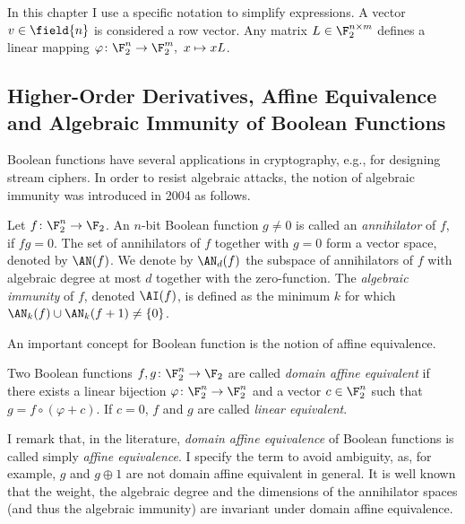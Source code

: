 
In this chapter I use a specific notation to simplify expressions. A vector $v \in \field{n}$ is considered a row vector. Any matrix $L \in \F_2^{n\times m}$ defines a linear mapping $\varphi \colon \F_2^n \rightarrow \F_2^m, \ x \mapsto xL$.

\subsection{Higher-Order Derivatives, Affine Equivalence and Algebraic Immunity of Boolean Functions}

Boolean functions have several applications in cryptography, e.g., for designing stream ciphers. In order to resist algebraic attacks, the notion of algebraic immunity was introduced in 2004 as follows.

\begin{definition}
Let $f\colon \F_2^n \rightarrow \F_2$. An $n$-bit Boolean function $g \neq 0$ is called an \emph{annihilator} of $f$, if $f g = 0$. The set of annihilators of $f$ together with $g=0$ form a vector space, denoted by $\AN(f)$. We denote by $\AN_d(f)$ the subspace of annihilators of $f$ with algebraic degree at most $d$ together with the zero-function. The \emph{algebraic immunity} of $f$, denoted $\AI(f)$, is defined as the minimum $k$ for which $\AN_k(f) \cup \AN_k(f+1) \neq \{0\}$.
\end{definition}

An important concept for Boolean function is the notion of affine equivalence. 

\begin{definition}
Two Boolean functions $f,g\colon \F_2^n \rightarrow \F_2$ are called \emph{domain affine equivalent} if there exists a linear bijection $\varphi \colon \F_2^n \rightarrow \F_2^n$ and a vector $c \in \F_2^n$ such that $g = f \circ (\varphi + c)$. If $c = 0$, $f$ and $g$ are called \emph{linear equivalent}.
\end{definition}
I remark that, in the literature, \emph{domain affine equivalence} of Boolean functions is called simply \emph{affine equivalence}. I specify the term to avoid ambiguity, as, for example, $g$ and $g\oplus1$ are not domain affine equivalent in general.
It is well known that the weight, the algebraic degree and the dimensions of the annihilator spaces (and thus the algebraic immunity) are invariant under domain affine equivalence. 

